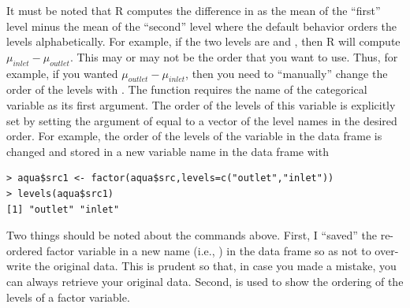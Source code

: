 \documentclass[10pt,openany]{book}\usepackage[]{graphicx}\usepackage[]{color}
\makeatletter
\newenvironment{kframe}{%
 \def\at@end@of@kframe{}%
 \ifinner\ifhmode%
  \def\at@end@of@kframe{\end{minipage}}%
  \begin{minipage}{\columnwidth}%
 \fi\fi%
 \def\FrameCommand##1{\hskip\@totalleftmargin \hskip-\fboxsep
 \colorbox{shadecolor}{##1}\hskip-\fboxsep
     \hskip-\linewidth \hskip-\@totalleftmargin \hskip\columnwidth}%
 \MakeFramed {\advance\hsize-\width
   \@totalleftmargin\z@ \linewidth\hsize
   \@setminipage}}%
 {\par\unskip\endMakeFramed%
 \at@end@of@kframe}
\newenvironment{knitrout}{}{} %
\makeatother
\begin{document}

It must be noted that R computes the difference in  as the mean of the ``first'' level minus the mean of the ``second'' level where the default behavior orders the levels alphabetically.  For example, if the two levels are  and , then R will compute $\mu_{inlet}-\mu_{outlet}$.  This may or may not be the order that you want to use.  Thus, for example, if you wanted $\mu_{outlet}-\mu_{inlet}$, then you need to ``manually'' change the order of the levels with .  The  function requires the name of the categorical variable as its first argument.  The order of the levels of this variable is explicitly set by setting the  argument of  equal to a vector of the level names in the desired order.  For example, the order of the levels of the  variable in the  data frame is changed and stored in a new variable name in the data frame with
\begin{knitrout}
\color{fgcolor}\begin{kframe}
\begin{verbatim}
> aqua$src1 <- factor(aqua$src,levels=c("outlet","inlet"))
> levels(aqua$src1)
[1] "outlet" "inlet" 
\end{verbatim}
\end{kframe}
\end{knitrout}
Two things should be noted about the commands above.  First, I ``saved'' the re-ordered factor variable in a new name (i.e., ) in the data frame so as not to over-write the original data.  This is prudent so that, in case you made a mistake, you can always retrieve your original data.  Second,  is used to show the ordering of the levels of a factor variable.
\end{document}
